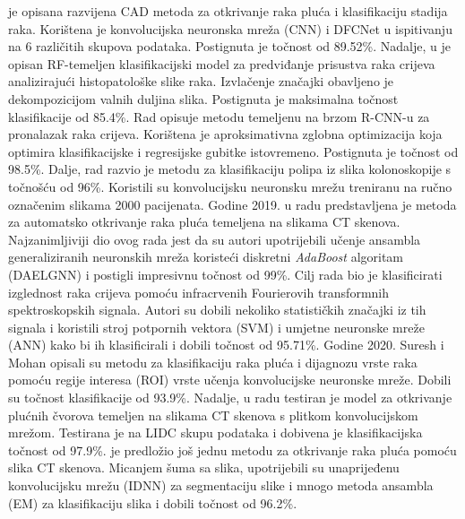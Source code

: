 \documentclass[conference, utf8]{IEEEtran}
\begin{document}
\cite{masood2018computer} je opisana razvijena CAD metoda za otkrivanje raka pluća i klasifikaciju stadija raka. Korištena je konvolucijska neuronska mreža (CNN) i DFCNet u ispitivanju na 6 različitih skupova podataka. Postignuta je točnost od 89.52\%. Nadalje, u \cite{babu2018colon} je opisan RF-temeljen klasifikacijski model za predviđanje prisustva raka crijeva analizirajući histopatološke slike raka. Izvlačenje značajki obavljeno je dekompozicijom valnih duljina slika. Postignuta je maksimalna točnost klasifikacije od 85.4\%. Rad \cite{mo2018efficient} opisuje metodu temeljenu na brzom R-CNN-u za pronalazak raka crijeva. Korištena je aproksimativna zglobna optimizacija koja optimira klasifikacijske i regresijske gubitke istovremeno. Postignuta je točnost od 98.5\%. Dalje, rad \cite{urban2018deep} razvio je metodu za klasifikaciju polipa iz slika kolonoskopije s točnošću od 96\%. Koristili su konvolucijsku neuronsku mrežu treniranu na ručno označenim slikama 2000 pacijenata. Godine 2019. u radu \cite{shakeel2020automatic} predstavljena je metoda za automatsko otkrivanje raka pluća temeljena na slikama CT skenova. Najzanimljiviji dio ovog rada jest da su autori upotrijebili učenje ansambla generaliziranih neuronskih mreža koristeći diskretni \textit{AdaBoost} algoritam (DAELGNN) i postigli impresivnu točnost od 99\%. Cilj rada \cite{toraman2019classification} bio je klasificirati izglednost raka crijeva pomoću infracrvenih Fourierovih transformnih spektroskopskih signala. Autori su dobili nekoliko statističkih značajki iz tih signala i koristili stroj potpornih vektora (SVM) i umjetne neuronske mreže (ANN) kako bi ih klasificirali i dobili točnost od 95.71\%. Godine 2020. Suresh i Mohan \cite{suresh2020roi} opisali su metodu za klasifikaciju raka pluća i dijagnozu vrste raka pomoću regije interesa (ROI) vrste učenja konvolucijske neuronske mreže. Dobili su točnost klasifikacije od 93.9\%. Nadalje, u radu \cite{masud2020light} testiran je model za otkrivanje plućnih čvorova temeljen na slikama CT skenova s plitkom konvolucijskom mrežom. Testirana je na LIDC skupu podataka i dobivena je klasifikacijska točnost od 97.9\%. \cite{shakeel2022automatic} je predložio još jednu metodu za otkrivanje raka pluća pomoću slika CT skenova. Micanjem šuma sa slika, upotrijebili su unaprijeđenu konvolucijsku mrežu (IDNN) za segmentaciju slike i mnogo metoda ansambla (EM) za klasifikaciju slika i dobili točnost od 96.2\%.
	
\end{document}
